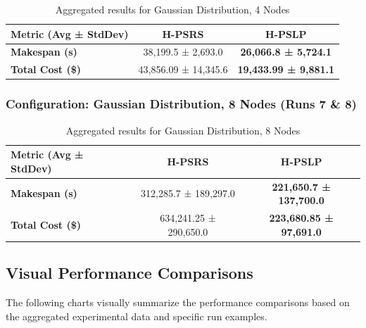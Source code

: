 \documentclass[]{interact}
\theoremstyle{plain}
\theoremstyle{definition}
\theoremstyle{remark}
\begin{document}
\begin{table}[H]
\centering
\caption{Aggregated results for Gaussian Distribution, 4 Nodes}
\label{tab:agg_gaussian_4}
\begin{tabular}{@{}lcc@{}}
\toprule
\textbf{Metric (Avg ± StdDev)} & \textbf{H-PSRS} & \textbf{H-PSLP} \\
\midrule
\textbf{Makespan (\textmu{}s)} & 38,199.5 ± 2,693.0 & \textbf{26,066.8 ± 5,724.1} \\
\textbf{Total Cost (\$)} & 43,856.09 ± 14,345.6 & \textbf{19,433.99 ± 9,881.1} \\
\bottomrule
\end{tabular}
\end{table}

\subsubsection{Configuration: Gaussian Distribution, 8 Nodes (Runs 7 \& 8)}

\begin{table}[H]
\centering
\caption{Aggregated results for Gaussian Distribution, 8 Nodes}
\label{tab:agg_gaussian_8}
\begin{tabular}{@{}lcc@{}}
\toprule
\textbf{Metric (Avg ± StdDev)} & \textbf{H-PSRS} & \textbf{H-PSLP} \\
\midrule
\textbf{Makespan (\textmu{}s)} & 312,285.7 ± 189,297.0 & \textbf{221,650.7 ± 137,700.0} \\ 
\textbf{Total Cost (\$)} & 634,241.25 ± 290,650.0 & \textbf{223,680.85 ± 97,691.0} \\ 
\bottomrule
\end{tabular}
\end{table}

\subsection{Visual Performance Comparisons}
\label{sec:visual_perf}

The following charts visually summarize the performance comparisons based on the aggregated experimental data and specific run examples.
\end{document}
